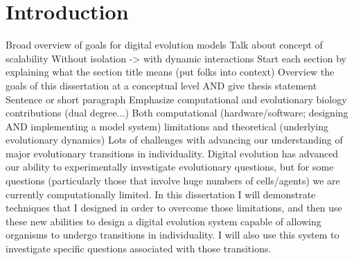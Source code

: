 \chapter{Introduction}
\label{chap:introduction}

Broad overview of goals for digital evolution models
Talk about concept of scalability
Without isolation -> with dynamic interactions
Start each section by explaining what the section title means (put folks into context)
Overview the goals of this dissertation at a conceptual level AND give thesis statement
Sentence or short paragraph
Emphasize computational and evolutionary biology contributions (dual degree...)
Both computational (hardware/software; designing AND implementing a model system) limitations and theoretical (underlying evolutionary dynamics)
Lots of challenges with advancing our understanding of major evolutionary transitions in individuality.
Digital evolution has advanced our ability to experimentally investigate evolutionary questions, but for some questions (particularly those that involve huge numbers of cells/agents) we are currently computationally limited.
In this dissertation I will demonstrate techniques that I designed in order to overcome those limitations, and then use these new abilities to design a digital evolution system capable of allowing organisms to undergo transitions in individuality.
I will also use this system to investigate specific questions associated with those transitions.

